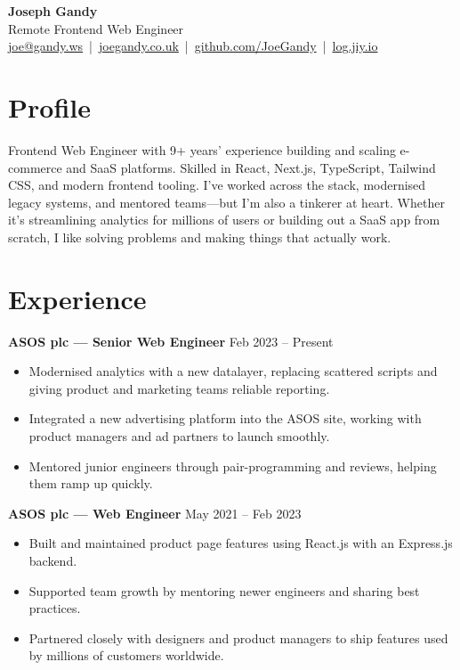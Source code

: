 \documentclass[11pt,a4paper]{article}
\begin{document}
\begin{center}
    {\LARGE \textbf{Joseph Gandy}} \\[4pt]
    Remote Frontend Web Engineer \\[4pt]
    \href{mailto:joe@gandy.ws}{joe@gandy.ws} \,|\, \href{https://joegandy.co.uk}{joegandy.co.uk} \,|\, \href{https://github.com/JoeGandy}{github.com/JoeGandy} \,|\, \href{https://log.jiy.io}{log.jiy.io}
\end{center}

\vspace{1em}

\section*{Profile}
Frontend Web Engineer with 9+ years' experience building and scaling e-commerce and SaaS platforms. Skilled in React, Next.js, TypeScript, Tailwind CSS, and modern frontend tooling. I've worked across the stack, modernised legacy systems, and mentored teams---but I'm also a tinkerer at heart. Whether it's streamlining analytics for millions of users or building out a SaaS app from scratch, I like solving problems and making things that actually work.

\section*{Experience}
\textbf{ASOS plc --- Senior Web Engineer} \hfill Feb 2023 -- Present \\
\begin{itemize}
  \item Modernised analytics with a new datalayer, replacing scattered scripts and giving product and marketing teams reliable reporting.
  \item Integrated a new advertising platform into the ASOS site, working with product managers and ad partners to launch smoothly.
  \item Mentored junior engineers through pair-programming and reviews, helping them ramp up quickly.
\end{itemize}

\textbf{ASOS plc --- Web Engineer} \hfill May 2021 -- Feb 2023 \\
\begin{itemize}
  \item Built and maintained product page features using React.js with an Express.js backend.
  \item Supported team growth by mentoring newer engineers and sharing best practices.
  \item Partnered closely with designers and product managers to ship features used by millions of customers worldwide.
\end{itemize}
\end{document}
